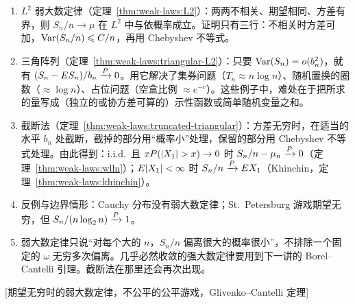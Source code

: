 
\begin{enumerate}
\item $L^2$ 弱大数定律（定理~\ref{thm:weak-laws:L2}）：两两不相关、期望相同、方差有界，则 $S_n/n\to\mu$ 在 $L^2$ 中与依概率成立。证明只有三行：不相关时方差可加，$\operatorname{Var}(S_n/n)\leqslant C/n$，再用 Chebyshev 不等式。
\item 三角阵列（定理~\ref{thm:weak-laws:triangular-L2}）：只要 $\operatorname{Var}(S_n)=o(b_n^2)$，就有 $(S_n-ES_n)/b_n\xrightarrow{P}0$。用它解决了集券问题（$T_n\approx n\log n$）、随机置换的圈数（$\approx\log n$）、占位问题（空盒比例 $\approx e^{-c}$）。这些例子中，难处在于把所求的量写成（独立的或协方差可算的）示性函数或简单随机变量之和。
\item 截断法（定理~\ref{thm:weak-laws:truncated-triangular}）：方差无穷时，在适当的水平 $b_n$ 处截断，截掉的部分用“概率小”处理，保留的部分用 Chebyshev 不等式处理。由此得到：i.i.d.\ 且 $xP(\lvert X_1\rvert>x)\to0$ 时 $S_n/n-\mu_n\xrightarrow{P}0$（定理~\ref{thm:weak-laws:wlln}）；$E\lvert X_1\rvert<\infty$ 时 $S_n/n\xrightarrow{P} EX_1$（Khinchin，定理~\ref{thm:weak-laws:khinchin}）。
\item 反例与边界情形：Cauchy 分布没有弱大数定律；St.\ Petersburg 游戏期望无穷，但 $S_n/(n\log_2n)\xrightarrow{P}1$。
\item 弱大数定律只说“对每个大的 $n$，$S_n/n$ 偏离很大的概率很小”，不排除一个固定的 $\omega$ 无穷多次偏离。几乎必然收敛的强大数定律要用到下一讲的 Borel--Cantelli 引理。截断法在那里还会再次出现。
\end{enumerate}

[期望无穷时的弱大数定律，不公平的公平游戏，Glivenko–Cantelli 定理]
\label{hw:weak-laws}


